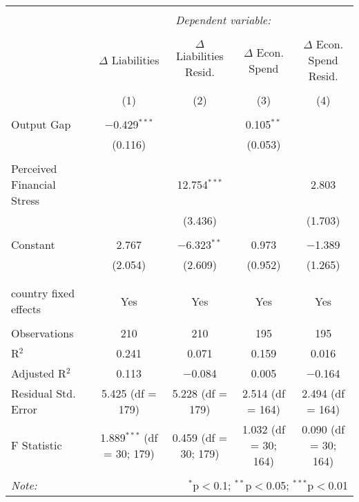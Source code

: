 
\begingroup 
\footnotesize 
\begin{tabular}{@{\extracolsep{5pt}}lcccc} 
\\[-1.8ex]\hline 
\hline \\[-1.8ex] 
 & \multicolumn{4}{c}{\textit{Dependent variable:}} \\ 
\cline{2-5} 
\\[-1.8ex] & $\Delta$ Liabilities & $\Delta$ Liabilities Resid. & $\Delta$ Econ. Spend & $\Delta$ Econ. Spend Resid. \\ 
\\[-1.8ex] & (1) & (2) & (3) & (4)\\ 
\hline \\[-1.8ex] 
 Output Gap & $-$0.429$^{***}$ &  & 0.105$^{**}$ &  \\ 
  & (0.116) &  & (0.053) &  \\ 
  & & & & \\ 
 Perceived Financial Stress &  & 12.754$^{***}$ &  & 2.803 \\ 
  &  & (3.436) &  & (1.703) \\ 
  & & & & \\ 
 Constant & 2.767 & $-$6.323$^{**}$ & 0.973 & $-$1.389 \\ 
  & (2.054) & (2.609) & (0.952) & (1.265) \\ 
  & & & & \\ 
\hline \\[-1.8ex] 
country fixed effects & Yes & Yes & Yes & Yes \\ 
\hline \\[-1.8ex] 
Observations & 210 & 210 & 195 & 195 \\ 
R$^{2}$ & 0.241 & 0.071 & 0.159 & 0.016 \\ 
Adjusted R$^{2}$ & 0.113 & $-$0.084 & 0.005 & $-$0.164 \\ 
Residual Std. Error & 5.425 (df = 179) & 5.228 (df = 179) & 2.514 (df = 164) & 2.494 (df = 164) \\ 
F Statistic & 1.889$^{***}$ (df = 30; 179) & 0.459 (df = 30; 179) & 1.032 (df = 30; 164) & 0.090 (df = 30; 164) \\ 
\hline 
\hline \\[-1.8ex] 
\textit{Note:}  & \multicolumn{4}{r}{$^{*}$p$<$0.1; $^{**}$p$<$0.05; $^{***}$p$<$0.01} \\ 
\end{tabular} 
\endgroup 

